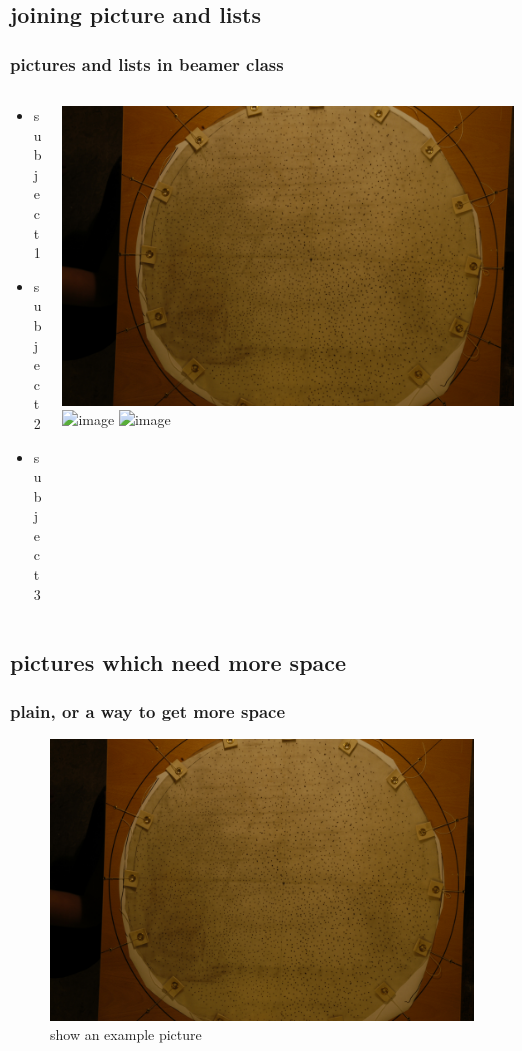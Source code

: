 \documentclass{beamer}
\begin{document}
\subsection{joining picture and lists} 

\begin{frame}
\frametitle{pictures and lists in beamer class}
\begin{columns}
\begin{column}{5cm}
\begin{itemize}
\item<1-> subject 1
\item<3-> subject 2
\item<5-> subject 3
\end{itemize}
\vspace{3cm} 
\end{column}
\begin{column}{5cm}
\begin{overprint}
\includegraphics<2>[scale=0.05]{PIC1.jpg}
\includegraphics<4>[scale=0.05]{PIC2.jpg}
\includegraphics<6>[scale=0.05]{PIC3.jpg}
\end{overprint}
\end{column}
\end{columns}
\end{frame}


\subsection{pictures which need more space} 
\begin{frame}[plain]
\frametitle{plain, or a way to get more space}
\begin{figure}
\includegraphics[scale=0.05]{PIC1.jpg} 
\caption{show an example picture}
\end{figure}
\end{frame}
\end{document}
